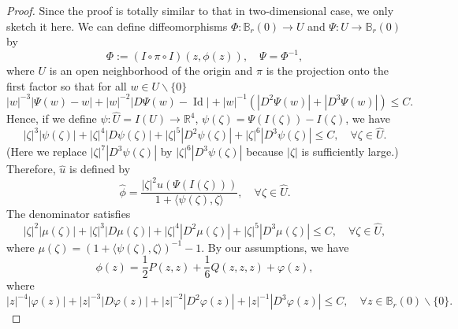 \documentclass[11pt,letterpaper]{amsart}
\DeclareMathOperator{\Id}{Id}
\newcommand{\bR}{\mathbb{R}}
\theoremstyle{definition}
\theoremstyle{remark}
\numberwithin{equation}{section}
\begin{document}
\begin{proof}
    Since the proof is totally similar to that in two-dimensional case, we only sketch it here. We can define diffeomorphisms $\Phi: \mathbb{B}_r(0)\to U$ and $\Psi:U\to \mathbb{B}_r(0)$ by
    \begin{equation*}
        \Phi:=\left(I\circ \pi\circ I\right)(z,\phi(z)),\quad \Psi=\Phi^{-1}, 
    \end{equation*}
    where $U$ is an open neighborhood of the origin and $\pi$ is the projection onto the first factor so that for all $ w\in U\backslash \{0\}$
    \begin{equation*}
        |w|^{-3}|\Psi(w)-w|+|w|^{-2}|D\Psi(w)-\Id|+|w|^{-1}\left(|D^2\Psi(w)|+{|D^3\Psi(w)|}\right)\leq C.
    \end{equation*}
Hence, if we define $\psi: \hat{U}=I(U)\to \bR^4$, $\psi(\zeta)=\Psi(I(\zeta))-I(\zeta)$, we have
\begin{equation*}
    |\zeta|^3|\psi(\zeta)|+|\zeta|^4|D\psi(\zeta)|+|\zeta|^5|D^2\psi(\zeta)|+|\zeta|^6|D^3\psi(\zeta)|\leq C, \quad \forall\zeta \in \hat{U}.
\end{equation*}
(Here we replace $|\zeta|^7|D^3\psi(\zeta)|$ by $|\zeta|^6|D^3\psi(\zeta)|$ because $|\zeta|$ is sufficiently large.)
Therefore, $\hat{u}$ is defined by
\begin{equation*}
    \hat{\phi}=\frac{|\zeta|^2u(\Psi(I(\zeta)))}{1+\langle \psi(\zeta), \zeta\rangle}, \quad \forall \zeta\in \hat{U}.
\end{equation*}
The denominator satisfies
\begin{equation*}
    |\zeta|^2|\mu(\zeta)|+|\zeta|^3|D\mu(\zeta)|+|\zeta|^4|D^2\mu(\zeta)|+|\zeta|^5|D^3\mu(\zeta)|\leq C, \quad \forall\zeta \in \hat{U},
\end{equation*}
where $\mu(\zeta)=\left(1+\langle \psi(\zeta), \zeta\rangle\right)^{-1}-1$.
By our assumptions, we have
\begin{equation*}
    \phi(z)=\frac{1}{2}P\left(z,z\right)+\frac{1}{6}Q(z,z,z)+\varphi(z),
\end{equation*}
where
\begin{equation*}
    |z|^{-4}|\varphi(z)|+|z|^{-3}|D\varphi(z)|+|z|^{-2}|D^2\varphi(z)|+|z|^{-1}|D^3\varphi(z)|\leq C, \quad \forall z\in \mathbb{B}_r(0)\backslash \{0\}.

\end{equation*}
\end{proof}
\end{document}
